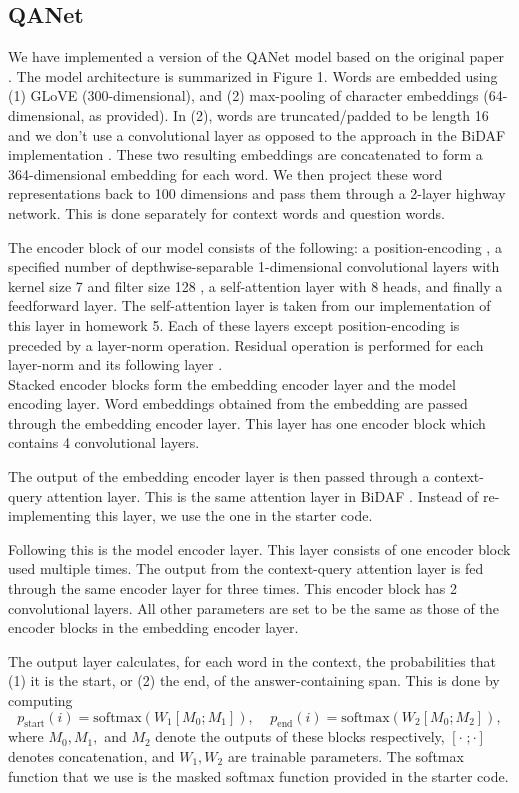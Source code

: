 \documentclass{article}
\begin{document}
\subsection{QANet}
We have implemented a version of the QANet model based on the original paper \cite{YU}. The model architecture is summarized in Figure 1. Words are embedded using (1) GLoVE (300-dimensional), and (2) max-pooling of character embeddings (64-dimensional, as provided). In (2), words are truncated/padded to be length 16 and we don't use a convolutional layer as opposed to the approach in the BiDAF implementation \cite{SEO}. These two resulting embeddings are concatenated to form a 364-dimensional embedding for each word. We then project these word representations back to 100 dimensions and pass them through a 2-layer highway network. This is done separately for context words and question words. 

The encoder block of our model consists of the following: a position-encoding \cite{VAS}, a specified number of depthwise-separable 1-dimensional convolutional layers with kernel size 7 and filter size 128 \cite{CHO}, a self-attention layer with 8 heads, and finally a feedforward layer. The self-attention layer is taken from our implementation of this layer in homework 5. Each of these layers except position-encoding is preceded by a layer-norm operation. Residual operation is performed for each layer-norm and its following layer \cite{YU}. \\

Stacked encoder blocks form the embedding encoder layer and the model encoding layer. Word embeddings obtained from the embedding are passed through the embedding encoder layer. This layer has one encoder block which contains 4 convolutional layers. 

The output of the embedding encoder layer is then passed through a context-query attention layer. This is the same attention layer in BiDAF \cite{SEO}. Instead of re-implementing this layer, we use the one in the starter code.

Following this is the model encoder layer. This layer consists of one encoder block used multiple times. The output from the context-query attention layer is fed through the same encoder layer for three times. This encoder block has 2 convolutional layers. All other parameters are set to be the same as those of the encoder blocks in the embedding encoder layer.

The output layer calculates, for each word in the context, the probabilities that (1) it is the start, or (2) the end, of the answer-containing span. This is done by computing 
$$p_{\text{start}}(i)=\text{softmax}(W_1[M_0;M_1]),\;\;\;\; p_{\text{end}}(i)=\text{softmax}(W_2[M_0;M_2]),$$
where $M_0,M_1,$ and $M_2$ denote the outputs of these blocks respectively, $[\cdot \;; \cdot]$ denotes concatenation, and $W_1,W_2$ are trainable parameters. The softmax function that we use is the masked softmax function provided in the starter code.
\end{document}
